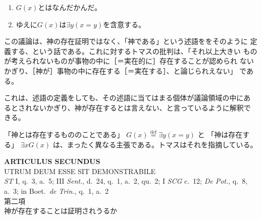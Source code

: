 \documentclass[10pt]{jsarticle}
\begin{document}
\begin{enumerate}
 \item $G(x)$とはなんだかんだ。
 \item ゆえに$G(x)$は$\exists y(x=y)$を含意する。
\end{enumerate}

この議論は、神の存在証明ではなく、「神である」という述語ををそのように
定義する、という話である。これに対するトマスの批判は、「それ以上大きい
ものが考えられないものが事物の中に［＝実在的に］存在することが認められ
ないかぎり、［神が］事物の中に存在する［＝実在する］、と論じられえない」
である。

これは、述語の定義をしても、その述語に当てはまる個体が議論領域の中にあ
るとされないかぎり、神が存在するとは言えない、と言っているように解釈で
きる。

「神とは存在するもののことである」
$G(x) \overset{\mathrm{def}}{=} \exists y(x=y)$
と
「神は存在する」
$\exists xG(x)$
は、まったく異なる主張である。トマスはそれを指摘している。
 

\newpage
{}
\begin{center}
 {\Large {\bf ARTICULUS SECUNDUS}}\\
 {\large UTRUM DEUM ESSE SIT DEMONSTRABILE}\\
 {\footnotesize {\it ST} I, q.~3, a.~5; III {\it Sent.}, d.~24, q.~1,
 a.~2, qu.~2; I {\it SCG} c.~12; {\it De Pot.}, q.~8, a.~3; in
 Boet.~{\it de Trin.}, q.~1, a.~2}\\
 {\Large 第二項\\神が存在することは証明されうるか}
\end{center}
\end{document}
